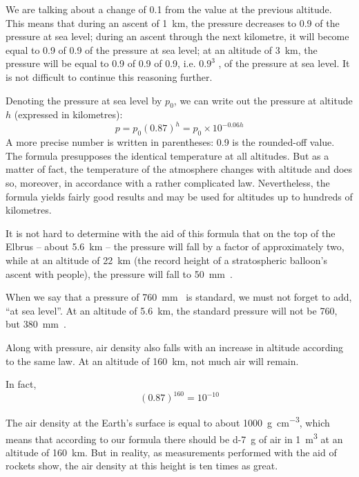 We are talking about a change of 0.1 from the value at the previous altitude. This means that during an ascent of \SI{1}{\kilo\meter}, the pressure decreases to 0.9 of the pressure at sea level; during an ascent through the next kilometre, it will become equal to 0.9 of 0.9 of the pressure at sea level; at an altitude of  \SI{3}{\kilo\meter}, the pressure will be equal to 0.9 of 0.9 of 0.9, i.e. $0.9^{3}$ , of the pressure at sea level. It is not difficult to continue this reasoning further.

Denoting the pressure at sea level by $p_{0}$, we can write out the pressure at altitude $h$ (expressed in kilometres):
\begin{equation*}%
p = p_{0} (0.87)^{h} = p_{0} \times 10^{-0.06h} 
\end{equation*}
A more precise number is written in parentheses: 0.9 is the rounded-off value. The formula presupposes the
identical temperature at all altitudes. But as a matter of fact, the temperature of the atmosphere changes with
altitude and does so, moreover, in accordance with a rather complicated law. Nevertheless, the formula
yields fairly good results and may be used for altitudes up to hundreds of kilometres.

It is not hard to determine with the aid of this formula that on the top of the Elbrus -- about \SI{5.6}{\kilo\meter} -- the pressure will fall by a factor of approximately two, while at an altitude of \SI{22}{\kilo\meter} (the record height of a stratospheric balloon's ascent with people), the pressure will fall to \SI{50}{\milli\meter\mercury}.

When we say that a pressure of  \SI{760}{\milli\meter\mercury} is standard, we must not forget to add, ``at sea level''. At an altitude
of  \SI{5.6}{\kilo\meter}, the standard pressure will not be 760, but  \SI{380}{\milli\meter\mercury}.

Along with pressure, air density also falls with an increase in altitude according to the same law. At an altitude of \SI{160}{\kilo\meter}, not much air will remain.

In fact,
\begin{equation*}%
(0.87)^{160} = 10^{-10} 
\end{equation*}

The air density at the Earth's surface is equal to about  \SI{1000}{\gram\per\centi\metre\cubed}, which means that according to our formula there should be \SI{d-7}{\gram} of air in  \SI{1}{\metre\cubed} at an altitude of \SI{160}{\kilo\meter}. But in reality, as measurements performed with the aid of rockets show, the air density at this height is ten times as great.

